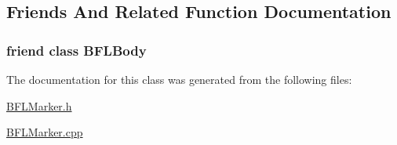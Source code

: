 \subsection{Friends And Related Function Documentation}
\subsubsection[{\texorpdfstring{B\+F\+L\+Body}{BFLBody}}]{\setlength{\rightskip}{0pt plus 5cm}friend class {\bf B\+F\+L\+Body}\hspace{0.3cm}{\ttfamily [friend]}}\hypertarget{class_b_f_l_marker_a253e046b9808d9a35fda96a16d22edb3}{}\label{class_b_f_l_marker_a253e046b9808d9a35fda96a16d22edb3}


The documentation for this class was generated from the following files\+:\begin{DoxyCompactItemize}
\item 
\hyperlink{_b_f_l_marker_8h}{B\+F\+L\+Marker.\+h}\item 
\hyperlink{_b_f_l_marker_8cpp}{B\+F\+L\+Marker.\+cpp}\end{DoxyCompactItemize}
